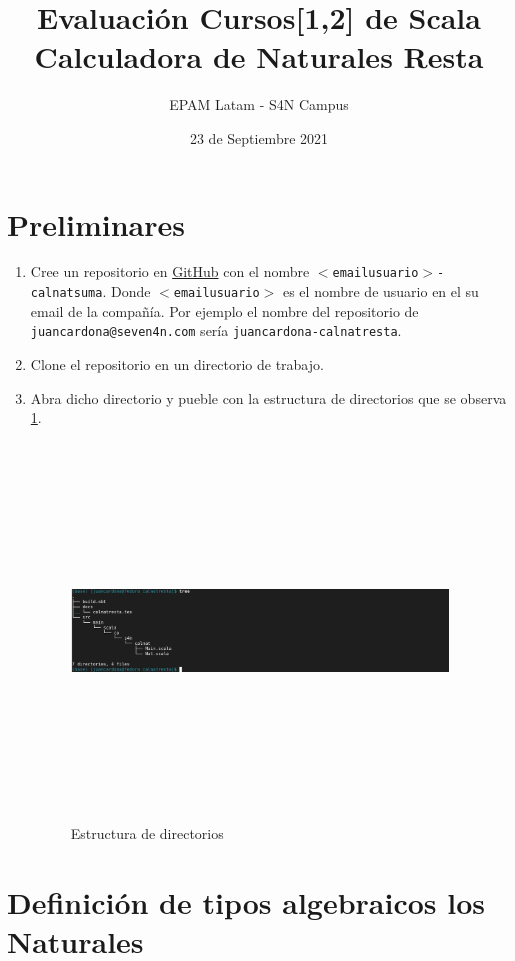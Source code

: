\documentclass[12pt]{article}
\title{Evaluación Cursos[1,2] de Scala\\Calculadora de Naturales Resta}
\date{23 de Septiembre 2021}
\author{EPAM Latam - S4N Campus}
\begin{document}
\maketitle

\section{Preliminares}
\label{sec:preliminares}

\begin{enumerate}
\item Cree un repositorio en \href{https://github.com}{GitHub} con el nombre \texttt{$<$emailusuario$>$-calnatsuma}. Donde \texttt{$<$emailusuario$>$} es el nombre de usuario en el su email de la compañía. Por ejemplo el nombre del repositorio de \texttt{juancardona@seven4n.com} sería \texttt{juancardona-calnatresta}.
\item Clone el repositorio en un directorio de trabajo.
\item Abra dicho directorio y pueble con la estructura de directorios que se observa \ref{fig:dir}.
  \begin{figure}[h]
    \centering
    \includegraphics[width=10cm,height=10cm]{../../../imagenes/jerarquia-calnatresta.png}
    \caption{Estructura de directorios}
    \label{fig:dir}
  \end{figure}

\end{enumerate}

\section{Definición de tipos algebraicos los Naturales}
\label{sec:definicio-de-tipos}
\end{document}
